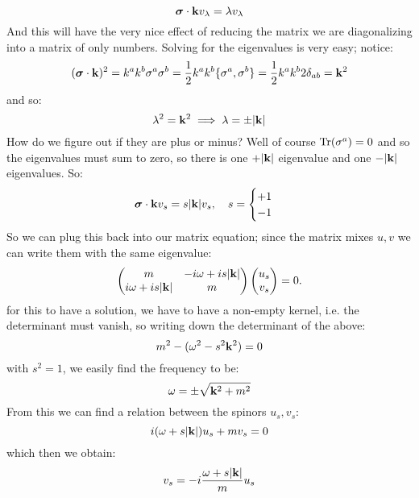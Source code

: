 \begin{equation}
    \mbox{\boldmath$ \sigma $} \cdot \mathbf{k} v_\lambda = \lambda v_\lambda
\end{equation}
And this will have the very nice effect of reducing the matrix we are diagonalizing into a matrix of only numbers. Solving for the eigenvalues is very easy; notice:
\begin{equation}
    (\mbox{\boldmath$ \sigma $} \cdot \mathbf{k})^2 = k^ak^b \sigma^a\sigma^b = \frac{1}{2}k^ak^b \{\sigma^a, \sigma^b\} = \frac{1}{2}k^ak^b 2\delta_{ab} =  \mathbf{k}^2
\end{equation}
and so:
\begin{equation}
    \lambda^2 = \mathbf{k}^2 \implies \lambda = \pm \lvert \mathbf{k} \rvert
\end{equation}
How do we figure out if they are plus or minus? Well of course $\mathrm{Tr}(\sigma^a) = 0$ and so the eigenvalues must sum to zero, so there is one $+\lvert \mathbf{k} \rvert$ eigenvalue and one $-\lvert \mathbf{k} \rvert$ eigenvalues. So:
\begin{equation}
    \mbox{\boldmath$ \sigma $} \cdot \mathbf{k} v_s = s\lvert \mathbf{k} \rvert v_s, \quad s = \begin{cases}
        +1 \\ -1
    \end{cases}
\end{equation}
So we can plug this back into our matrix equation; since the matrix mixes $u, v$ we can write them with the same eigenvalue:
\begin{equation}
    \begin{pmatrix}m & -i\omega + is\lvert \mathbf{k} \rvert \\ i\omega + is\lvert \mathbf{k} \rvert & m\end{pmatrix}\begin{pmatrix}u_s \\ v_s\end{pmatrix} = 0.
\end{equation}
for this to have a solution, we have to have a non-empty kernel, i.e. the determinant must vanish, so writing down the determinant of the above:
\begin{equation}
    m^2 - (\omega^2 - s^2\mathbf{k}^2) = 0
\end{equation}
with $s^2 = 1$, we easily find the frequency to be:
\begin{equation}
    \omega = \pm \sqrt{\mathbf{k}^2 + m^2}
\end{equation}
From this we can find a relation between the spinors $u_s, v_s$:
\begin{equation}
    i(\omega + s\lvert \mathbf{k} \rvert)u_s + mv_s = 0
\end{equation}
which then we obtain:
\begin{equation}
    v_s = -i\frac{\omega + s\lvert \mathbf{k} \rvert}{m}u_s
\end{equation}
